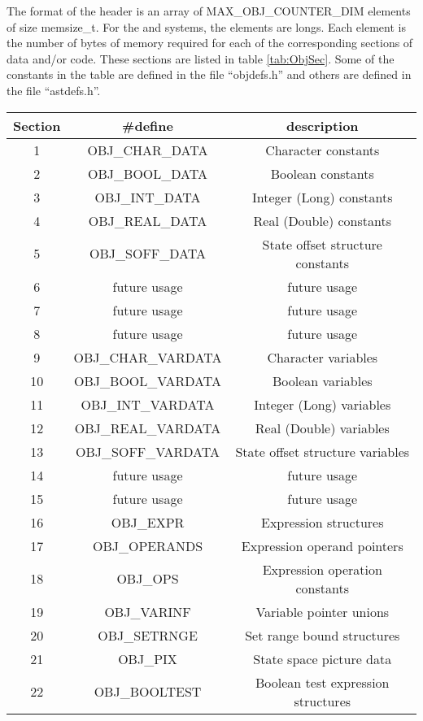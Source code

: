 The format of the header is an array of MAX\_OBJ\_COUNTER\_DIM elements of
size memsize\_t.   For the  and  systems, the
elements are longs.   Each element is the number of bytes of memory required
for each of the corresponding sections of data and/or code.   These sections
are listed in table \ref{tab:ObjSec}.
Some of the constants in the table are defined in the file ``objdefs.h'' and
others are defined in the file ``astdefs.h''.

\starttab
\begin{small}\begin{tabular}{|c|c|c|}
\hline Section & \#define & description \\
\hline
1 & OBJ\_CHAR\_DATA & Character constants \\
2 & OBJ\_BOOL\_DATA & Boolean constants \\
3 & OBJ\_INT\_DATA & Integer (Long) constants \\
4 & OBJ\_REAL\_DATA & Real (Double) constants \\
5 & OBJ\_SOFF\_DATA & State offset structure constants \\
6 & future usage & future usage \\
7 & future usage & future usage \\
8 & future usage & future usage \\
9 & OBJ\_CHAR\_VARDATA & Character variables \\
10 & OBJ\_BOOL\_VARDATA & Boolean variables \\
11 & OBJ\_INT\_VARDATA & Integer (Long) variables \\
12 & OBJ\_REAL\_VARDATA & Real (Double) variables \\
13 & OBJ\_SOFF\_VARDATA & State offset structure variables \\
14 & future usage & future usage \\
15 & future usage & future usage \\
16 & OBJ\_EXPR & Expression structures \\
17 & OBJ\_OPERANDS & Expression operand pointers \\
18 & OBJ\_OPS & Expression operation constants \\
19 & OBJ\_VARINF & Variable pointer unions \\
20 & OBJ\_SETRNGE & Set range bound structures \\
21 & OBJ\_PIX & State space picture data \\
22 & OBJ\_BOOLTEST & Boolean test expression structures \\

\end{tabular}
\end{small}
